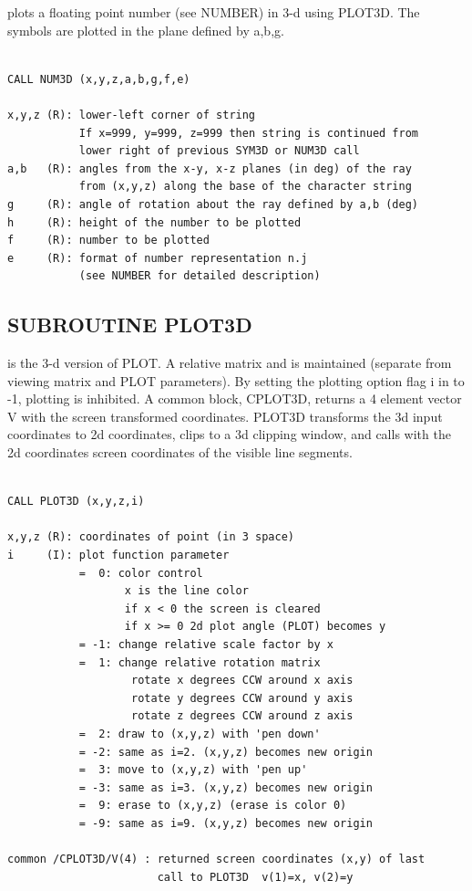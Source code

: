 \documentclass[11pt]{report}
\begin{document}
 plots a floating point number (see NUMBER) in 3-d using
PLOT3D.  The symbols are plotted in the plane defined by a,b,g.
\begin{verbatim}

CALL NUM3D (x,y,z,a,b,g,f,e)

x,y,z (R): lower-left corner of string
           If x=999, y=999, z=999 then string is continued from
           lower right of previous SYM3D or NUM3D call
a,b   (R): angles from the x-y, x-z planes (in deg) of the ray
           from (x,y,z) along the base of the character string
g     (R): angle of rotation about the ray defined by a,b (deg)
h     (R): height of the number to be plotted
f     (R): number to be plotted
e     (R): format of number representation n.j 
           (see NUMBER for detailed description)
\end{verbatim}

\subsection{SUBROUTINE PLOT3D}

 is the 3-d version of PLOT.  A relative  matrix and
 is maintained (separate from viewing matrix and PLOT parameters).
By setting the plotting option flag i in  to -1, plotting
is inhibited.  A common block, CPLOT3D, returns a 4 element
vector V with the screen transformed coordinates.  PLOT3D transforms
the 3d input coordinates to 2d coordinates, clips to a 3d clipping
window, and calls  with the 2d coordinates screen coordinates
of the visible line segments.
\begin{verbatim}

CALL PLOT3D (x,y,z,i)

x,y,z (R): coordinates of point (in 3 space)
i     (I): plot function parameter
           =  0: color control
                  x is the line color 
                  if x < 0 the screen is cleared
                  if x >= 0 2d plot angle (PLOT) becomes y
           = -1: change relative scale factor by x
           =  1: change relative rotation matrix
                   rotate x degrees CCW around x axis
                   rotate y degrees CCW around y axis
                   rotate z degrees CCW around z axis
           =  2: draw to (x,y,z) with 'pen down'
           = -2: same as i=2. (x,y,z) becomes new origin
           =  3: move to (x,y,z) with 'pen up'
           = -3: same as i=3. (x,y,z) becomes new origin
           =  9: erase to (x,y,z) (erase is color 0)
           = -9: same as i=9. (x,y,z) becomes new origin

common /CPLOT3D/V(4) : returned screen coordinates (x,y) of last
                       call to PLOT3D  v(1)=x, v(2)=y
\end{verbatim}
\end{document}
